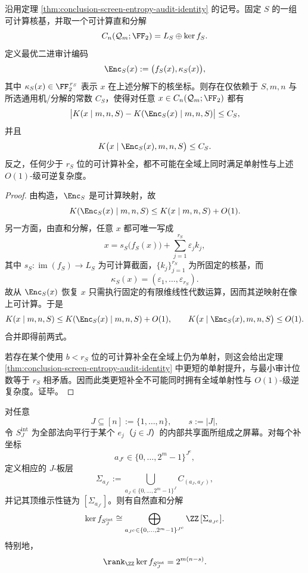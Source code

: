 \begin{theorem}\label{thm:conclusion-screen-optimal-audit-kolmogorov-isometry}
沿用定理 \ref{thm:conclusion-screen-entropy-audit-identity} 的记号。固定 \(S\) 的一组可计算核基，并取一个可计算直和分解
\[
C_n(\mathcal Q_m;\FF_2)=L_S\oplus \ker f_S.
\]
定义最优二进审计编码
\[
\Enc_S(x):=\bigl(f_S(x),\kappa_S(x)\bigr),
\]
其中 \(\kappa_S(x)\in \FF_2^{\,r_S}\) 表示 \(x\) 在上述分解下的核坐标。则存在仅依赖于 \(S,m,n\) 与所选通用机/分解的常数 \(C_S\)，使得对任意 \(x\in C_n(\mathcal Q_m;\FF_2)\) 都有
\[
\bigl|K(x\mid m,n,S)-K(\Enc_S(x)\mid m,n,S)\bigr|\le C_S,
\]
并且
\[
K\bigl(x\mid \Enc_S(x),m,n,S\bigr)\le C_S.
\]
反之，任何少于 \(r_S\) 位的可计算补全，都不可能在全域上同时满足单射性与上述 \(O(1)\)-级可逆复杂度。
\end{theorem}

\begin{proof}
由构造，\(\Enc_S\) 是可计算映射，故
\[
K(\Enc_S(x)\mid m,n,S)\le K(x\mid m,n,S)+O(1).
\]
另一方面，由直和分解，任意 \(x\) 都可唯一写成
\[
x=s_S\bigl(f_S(x)\bigr)+\sum_{j=1}^{r_S}\varepsilon_j k_j,
\]
其中 \(s_S:\operatorname{im}(f_S)\to L_S\) 为可计算截面，\(\{k_j\}_{j=1}^{r_S}\) 为所固定的核基，而
\[
\kappa_S(x)=(\varepsilon_1,\dots,\varepsilon_{r_S}).
\]
故从 \(\Enc_S(x)\) 恢复 \(x\) 只需执行固定的有限维线性代数运算，因而其逆映射在像上可计算。于是
\[
K(x\mid m,n,S)\le K(\Enc_S(x)\mid m,n,S)+O(1),
\qquad
K\bigl(x\mid \Enc_S(x),m,n,S\bigr)\le O(1).
\]
合并即得前两式。

若存在某个使用 \(b<r_S\) 位的可计算补全在全域上仍为单射，则这会给出定理 \ref{thm:conclusion-screen-entropy-audit-identity} 中更短的单射提升，与最小审计位数等于 \(r_S\) 相矛盾。因而此类更短补全不可能同时拥有全域单射性与 \(O(1)\)-级逆复杂度。证毕。
\end{proof}

\begin{theorem}[内部坐标束屏幕核的板层分解]\label{thm:conclusion-coordinate-bundle-kernel-slab-decomposition}
对任意
\[
J\subseteq [n]:=\{1,\dots,n\},
\qquad
s:=|J|,
\]
令 \(S_J^{\mathrm{int}}\) 为全部法向平行于某个 \(e_j\)（\(j\in J\)）的内部共享面所组成之屏幕。对每个补坐标
\[
a_{J^c}\in\{0,\dots,2^m-1\}^{J^c},
\]
定义相应的 \(J\)-板层
\[
\Sigma_{a_{J^c}}
:=
\bigcup_{a_J\in \{0,\dots,2^m-1\}^{J}} C_{(a_J,a_{J^c})},
\]
并记其顶维示性链为 \([\Sigma_{a_{J^c}}]\)。则有自然直和分解
\[
\ker f_{S_J^{\mathrm{int}}}
\cong
\bigoplus_{a_{J^c}\in \{0,\dots,2^m-1\}^{J^c}}
\ZZ\,[\Sigma_{a_{J^c}}].
\]
特别地，
\[
\rank_{\ZZ}\ker f_{S_J^{\mathrm{int}}}=2^{m(n-s)}.
\]
\end{theorem}

